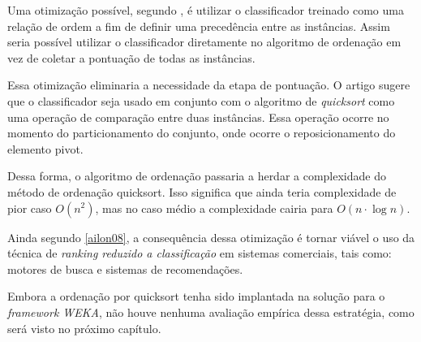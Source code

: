 Uma otimização possível, segundo \cite{ailon08}, é utilizar o classificador treinado como uma relação de ordem a fim de definir uma precedência entre as instâncias. Assim seria possível utilizar o classificador diretamente no algoritmo de ordenação em vez de coletar a pontuação de todas as instâncias.

Essa otimização eliminaria a necessidade da etapa de pontuação. O artigo sugere que o classificador seja usado em conjunto com o algoritmo de \emph{quicksort} como uma operação de comparação entre duas instâncias. Essa operação ocorre no momento do particionamento do conjunto, onde ocorre o reposicionamento do elemento pivot.

Dessa forma, o algoritmo de ordenação passaria a herdar a complexidade do método de ordenação quicksort. Isso significa que ainda teria complexidade de pior caso $O(n^2)$, mas no caso médio a complexidade cairia para $O(n \cdot \log{n})$.

Ainda segundo \ref{ailon08}, a consequência dessa otimização é tornar viável o uso da técnica de \emph{ranking reduzido a classificação} em sistemas comerciais, tais como: motores de busca e sistemas de recomendações.

Embora a ordenação por quicksort tenha sido implantada na solução para o \emph{framework WEKA}, não houve nenhuma avaliação empírica dessa estratégia, como será visto no próximo capítulo.


% 
% 
% 
% 
% 
%     
% 
%     
% 

